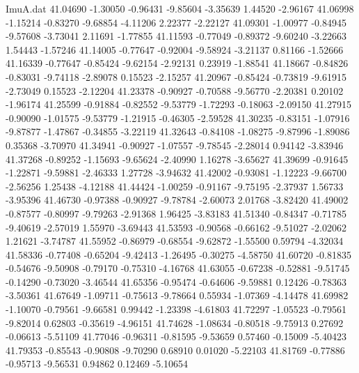 \begin{filecontents}{ImuA.dat}
  41.04690   -1.30050   -0.96431   -9.85604   -3.35639    1.44520   -2.96167
  41.06998   -1.15214   -0.83270   -9.68854   -4.11206    2.22377   -2.22127
  41.09301   -1.00977   -0.84945   -9.57608   -3.73041    2.11691   -1.77855
  41.11593   -0.77049   -0.89372   -9.60240   -3.22663    1.54443   -1.57246
  41.14005   -0.77647   -0.92004   -9.58924   -3.21137    0.81166   -1.52666
  41.16339   -0.77647   -0.85424   -9.62154   -2.92131    0.23919   -1.88541
  41.18667   -0.84826   -0.83031   -9.74118   -2.89078    0.15523   -2.15257
  41.20967   -0.85424   -0.73819   -9.61915   -2.73049    0.15523   -2.12204
  41.23378   -0.90927   -0.70588   -9.56770   -2.20381    0.20102   -1.96174
  41.25599   -0.91884   -0.82552   -9.53779   -1.72293   -0.18063   -2.09150
  41.27915   -0.90090   -1.01575   -9.53779   -1.21915   -0.46305   -2.59528
  41.30235   -0.83151   -1.07916   -9.87877   -1.47867   -0.34855   -3.22119
  41.32643   -0.84108   -1.08275   -9.87996   -1.89086    0.35368   -3.70970
  41.34941   -0.90927   -1.07557   -9.78545   -2.28014    0.94142   -3.83946
  41.37268   -0.89252   -1.15693   -9.65624   -2.40990    1.16278   -3.65627
  41.39699   -0.91645   -1.22871   -9.59881   -2.46333    1.27728   -3.94632
  41.42002   -0.93081   -1.12223   -9.66700   -2.56256    1.25438   -4.12188
  41.44424   -1.00259   -0.91167   -9.75195   -2.37937    1.56733   -3.95396
  41.46730   -0.97388   -0.90927   -9.78784   -2.60073    2.01768   -3.82420
  41.49002   -0.87577   -0.80997   -9.79263   -2.91368    1.96425   -3.83183
  41.51340   -0.84347   -0.71785   -9.40619   -2.57019    1.55970   -3.69443
  41.53593   -0.90568   -0.66162   -9.51027   -2.02062    1.21621   -3.74787
  41.55952   -0.86979   -0.68554   -9.62872   -1.55500    0.59794   -4.32034
  41.58336   -0.77408   -0.65204   -9.42413   -1.26495   -0.30275   -4.58750
  41.60720   -0.81835   -0.54676   -9.50908   -0.79170   -0.75310   -4.16768
  41.63055   -0.67238   -0.52881   -9.51745   -0.14290   -0.73020   -3.46544
  41.65356   -0.95474   -0.64606   -9.59881    0.12426   -0.78363   -3.50361
  41.67649   -1.09711   -0.75613   -9.78664    0.55934   -1.07369   -4.14478
  41.69982   -1.10070   -0.79561   -9.66581    0.99442   -1.23398   -4.61803
  41.72297   -1.05523   -0.79561   -9.82014    0.62803   -0.35619   -4.96151
  41.74628   -1.08634   -0.80518   -9.75913    0.27692   -0.06613   -5.51109
  41.77046   -0.96311   -0.81595   -9.53659    0.57460   -0.15009   -5.40423
  41.79353   -0.85543   -0.90808   -9.70290    0.68910    0.01020   -5.22103
  41.81769   -0.77886   -0.95713   -9.56531    0.94862    0.12469   -5.10654

\end{filecontents}
